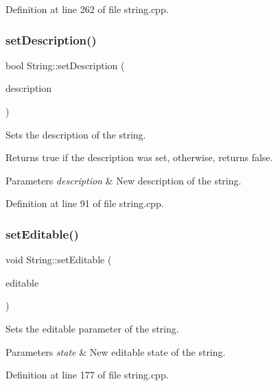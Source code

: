 Definition at line 262 of file string.\+cpp.

\mbox{\label{classString_ac91f0504a470b1602952cfd657979e4b}} 
\subsubsection{\texorpdfstring{set\+Description()}{setDescription()}}
{\footnotesize\ttfamily bool String\+::set\+Description (\begin{DoxyParamCaption}\item[{const Q\+String \&}]{description }\end{DoxyParamCaption})}



Sets the description of the string. 

Returns true if the description was set, otherwise, returns false. 
\begin{DoxyParams}{Parameters}
{\em description} & New description of the string. \\
\hline
\end{DoxyParams}


Definition at line 91 of file string.\+cpp.

\mbox{\label{classString_ae2ff38f8907c105ef577012a8db3f46e}} 
\subsubsection{\texorpdfstring{set\+Editable()}{setEditable()}}
{\footnotesize\ttfamily void String\+::set\+Editable (\begin{DoxyParamCaption}\item[{bool}]{editable }\end{DoxyParamCaption})}



Sets the editable parameter of the string. 


\begin{DoxyParams}{Parameters}
{\em state} & New editable state of the string. \\
\hline
\end{DoxyParams}


Definition at line 177 of file string.\+cpp.

